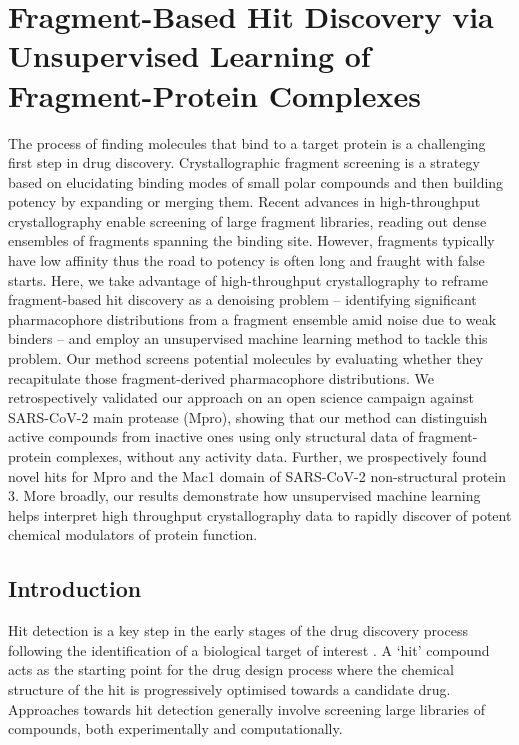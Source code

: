 
\chapter{Fragment-Based Hit Discovery via Unsupervised Learning of Fragment-Protein Complexes} \label{ch:fresco}
The process of finding molecules that bind to a target protein is a challenging first step in drug discovery. Crystallographic fragment screening is a strategy based on elucidating binding modes of small polar compounds and then building potency by expanding or merging them. Recent advances in high-throughput crystallography enable screening of large fragment libraries, reading out dense ensembles of fragments spanning the binding site. However, fragments typically have low affinity thus the road to potency is often long and fraught with false starts. Here, we take advantage of high-throughput crystallography to reframe fragment-based hit discovery as a denoising problem -- identifying significant pharmacophore distributions from a fragment ensemble amid noise due to weak binders -- and employ an unsupervised machine learning method to tackle this problem. Our method screens potential molecules by evaluating whether they recapitulate those fragment-derived pharmacophore distributions. We retrospectively validated our approach on an open science campaign against SARS-CoV-2 main protease (Mpro), showing that our method can distinguish active compounds from inactive ones using only structural data of fragment-protein complexes, without any activity data. Further, we prospectively found novel hits for Mpro and the Mac1 domain of SARS-CoV-2 non-structural protein 3. More broadly, our results demonstrate how unsupervised machine learning helps interpret high throughput crystallography data to rapidly discover of potent chemical modulators of protein function. 

\section{Introduction}

Hit detection is a key step in the early stages of the drug discovery process following the identification of a biological target of interest \cite{Hughes2011Principles}. A `hit' compound acts as the starting point for the drug design process where the chemical structure of the hit is progressively optimised towards a candidate drug. Approaches towards hit detection generally involve screening large libraries of compounds, both experimentally and computationally.

